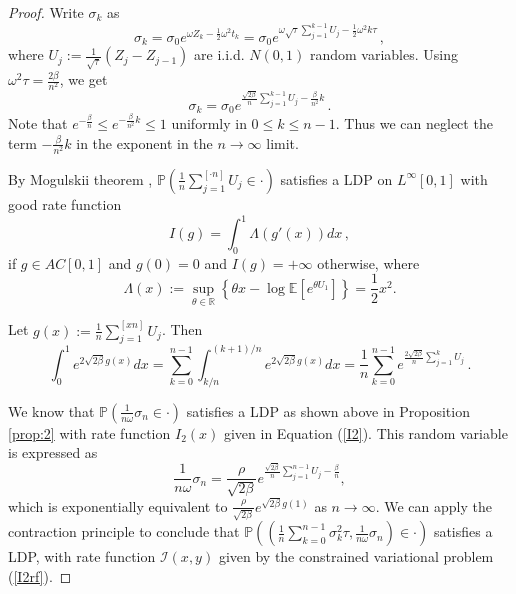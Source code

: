 \documentclass[11pt]{article}
\numberwithin{equation}{section}
\theoremstyle{plain}
\begin{document}
\begin{proof}
Write $\sigma_k$ as
\begin{equation}
\sigma_k = \sigma_0 e^{\omega Z_k - \frac12 \omega^2 t_k}  =
\sigma_0 e^{\omega \sqrt{\tau} \sum_{j=1}^{k-1} U_j - \frac12 \omega^2 k \tau}\,,
\end{equation}
where $U_j := \frac{1}{\sqrt{\tau}} (Z_j - Z_{j-1})$ are i.i.d. $N(0,1)$ random 
variables. 
Using $\omega^2 \tau = \frac{2\beta}{n^2}$, we get 
\begin{equation}
\sigma_k  =
\sigma_0 e^{\frac{\sqrt{2\beta}}{n} \sum_{j=1}^{k-1} U_j - \frac{\beta}{n^2}k}\,.
\end{equation}
Note that $e^{-\frac{\beta}{n}} \leq e^{- \frac{\beta}{n^2}k} \leq 1$
uniformly in $0 \leq k \leq n-1$. Thus we can neglect the term $-\frac{\beta}{n^2}k$
in the exponent in the $n\to \infty$ limit.

By Mogulskii theorem \cite{Dembo}, $\mathbb{P}( \frac{1}{n} \sum_{j=1}^{[\cdot n]} U_j 
\in \cdot ) $ satisfies a LDP on $L^\infty[0,1]$ with good rate function
\begin{equation}
I(g) = \int_0^1 \Lambda(g'(x)) dx\,,
\end{equation}
if $g\in AC[0,1]$ and $g(0)=0$ and $I(g)=+\infty$ otherwise,
where 
\begin{equation}
\Lambda(x) := \sup_{\theta \in \mathbb{R}} \left\{ \theta x - \log
\mathbb{E}[e^{\theta U_1}] \right\} = \frac12 x^2.
\end{equation}

Let $g(x) := \frac{1}{n} \sum_{j=1}^{[xn]} U_j$. Then
\begin{equation}
\int_0^1 e^{2\sqrt{2\beta} g(x) } dx = \sum_{k=0}^{n-1}
\int_{k/n}^{(k+1)/n} e^{2\sqrt{2\beta} g(x) } dx =
\frac{1}{n} \sum_{k=0}^{n-1} e^{\frac{2\sqrt{2\beta}}{n} \sum_{j=1}^k U_j }\,.
\end{equation}

We know that $\mathbb{P}(\frac{1}{n\omega} \sigma_n \in \cdot )$
satisfies a LDP as shown above in Proposition \ref{prop:2} with rate function
$I_2(x)$ given in Equation (\ref{I2}). 
This random  variable is expressed as
\begin{equation}
\frac{1}{n\omega} \sigma_n = \frac{\rho}{\sqrt{2\beta}} 
e^{\frac{\sqrt{2\beta}}{n} \sum_{j=1}^{n-1} U_j - \frac{\beta}{n} },
\end{equation}
which is exponentially equivalent to $\frac{\rho}{\sqrt{2\beta}} 
e^{\sqrt{2\beta} g(1)}$ as $n\rightarrow\infty$.
We can apply the contraction principle \cite{Dembo} to conclude that
$\mathbb{P}( (\frac{1}{n} \sum_{k=0}^{n-1} \sigma_k^2 \tau , 
\frac{1}{n\omega} \sigma_n ) \in \cdot ) $ satisfies a LDP, with 
rate function $\mathcal{I}(x,y)$ given by the constrained
variational problem (\ref{I2rf}).
\end{proof}
\end{document}
